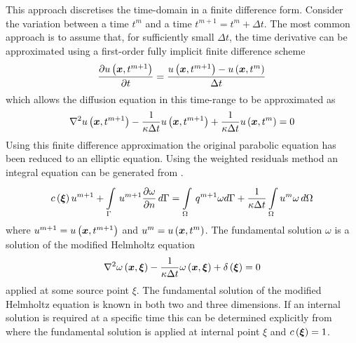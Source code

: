 This approach discretises the time-domain in a finite difference form.
Consider the variation between a time $t^{m}$ and a time $t^{m+1} =
t^{m} + \Delta t$.  The most common approach \cite{brebbia:1984} is to
assume that, for sufficiently small $\Delta t$, the time derivative can be
approximated using a first-order fully implicit finite difference scheme 
\begin{equation}
  \delby{\fnof{u}{\vect{x},t^{m+1}}}{t} =
  \dfrac{\fnof{u}{\vect{x},t^{m+1}} - \fnof{u}{\vect{x},t^{m}}}{\Delta t}
\label{eq:fdapprox}
\end{equation}
which allows the diffusion equation in this time-range to be approximated as
\begin{equation}
\laplacian{\fnof{u}{\vect{x},t^{m+1}}} - \dfrac{1}{\kappa \Delta t}
\fnof{u}{\vect{x},t^{m+1}} + \dfrac{1}{\kappa \Delta t} \fnof{u}{\vect{x},t^{m}} = 0
\label{eq:diffdapprox}
\end{equation}
Using this finite difference approximation the original parabolic equation
has been reduced to an elliptic equation.  Using the weighted residuals
method an integral equation can be generated from . 
\begin{equation}
\fnof{c}{\vect{\xi}}u^{m+1} + \goneint{u^{m+1} \delby{\omega}{n}}{\Gamma} =
\goneint{q^{m+1} \omega d\Gamma + \dfrac{1}{\kappa \Delta t}
\dintl{\Omega}{} u^{m} \omega}{\Omega}
\label{eq:fdbem}
\end{equation}
where $u^{m+1} = \fnof{u}{\vect{x},t^{m+1}}$ and $u^{m} = \fnof{u}{\vect{x},t^{m}}$.
The fundamental solution $\omega$ is a solution of the modified
Helmholtz equation
\begin{equation}
\laplacian{\fnof{\omega}{\vect{x},\vect{\xi}}} - \dfrac{1}{\kappa \Delta t}
\fnof{\omega}{\vect{x},\vect{\xi}} + \fnof{\delta}{\vect{\xi}} = 0 
\end{equation}
applied at some source point $\xi$.  The fundamental solution of the
modified Helmholtz equation is known in both two and three dimensions.  If
an internal solution is required at a specific time this can be determined
explicitly from  where the fundamental solution is applied
at internal point $\xi$ and $\fnof{c}{\vect{\xi}} = 1$.

